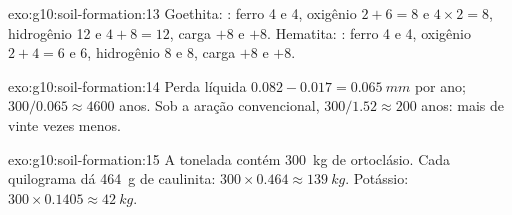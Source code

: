 \begin{solution}{exo:g10:soil-formation:13}
Goethita: : ferro 4 e 4,
oxigênio $2 + 6 = 8$ e $4 \times 2 = 8$, hidrogênio 12 e $4 + 8 = 12$, carga
$+8$ e $+8$. Hematita: : ferro 4
e 4, oxigênio $2 + 4 = 6$ e 6, hidrogênio 8 e 8, carga $+8$ e $+8$.
\end{solution}

\begin{solution}{exo:g10:soil-formation:14}
Perda líquida $0.082 - 0.017 = \qty{0.065}{mm}$ por ano;
$300/0.065 \approx 4600$ anos. Sob a aração convencional, $300/1.52 \approx 200$ anos: mais de
vinte vezes menos.
\end{solution}

\begin{solution}{exo:g10:soil-formation:15}
A tonelada contém \qty{300}{kg} de ortoclásio. Cada quilograma dá
\qty{464}{g} de caulinita: $300 \times 0.464 \approx \qty{139}{kg}$.
Potássio: $300 \times 0.1405 \approx \qty{42}{kg}$.
\end{solution}


